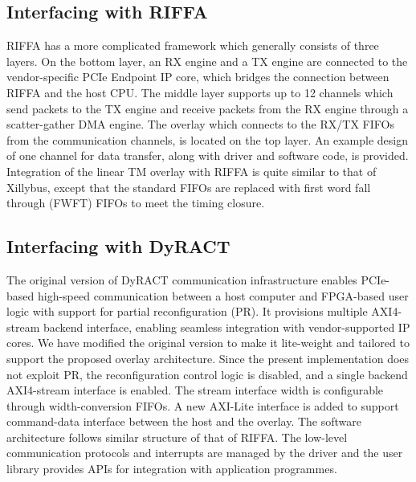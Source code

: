\subsection{Interfacing with RIFFA}
RIFFA has a more complicated framework which generally consists of three layers. 
On the bottom layer, an RX engine and a TX engine are connected to the vendor-specific PCIe Endpoint IP core, which bridges the connection between RIFFA and the host CPU. 
The middle layer supports up to 12 channels which send packets to the TX engine and receive packets from the RX engine through a scatter-gather DMA engine. 
The overlay which connects to the RX/TX FIFOs from the communication channels, is located on the top layer. 
An example design of one channel for data transfer, along with driver and software code, is provided. 
Integration of the linear TM overlay with RIFFA is quite similar to that of Xillybus, except
that the standard FIFOs are replaced with first word fall through (FWFT) FIFOs to meet the timing closure. 



\subsection{Interfacing with DyRACT}
The original version of DyRACT communication infrastructure enables PCIe-based high-speed communication between a host computer and FPGA-based user logic with support for partial reconfiguration (PR). 
It provisions multiple AXI4-stream backend interface, enabling seamless integration with vendor-supported IP cores. 
We have modified the original version to make it lite-weight and tailored to support the proposed overlay architecture. 
Since the present implementation does not exploit PR, the reconfiguration control logic is disabled, and a single backend AXI4-stream interface is enabled. 
The stream interface width is configurable through width-conversion FIFOs. 
A new AXI-Lite interface is added to support command-data interface between the host and the overlay.
The software architecture follows similar structure of that of RIFFA. 
The low-level communication protocols and interrupts are managed by the driver and the user library provides APIs for integration with application programmes. 


